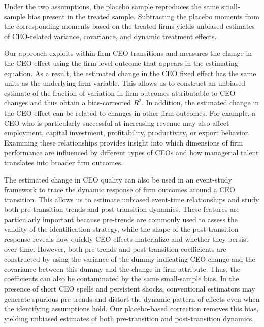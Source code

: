 \documentclass[11pt,a4paper]{article}
\begin{document}
Under the two assumptions, the placebo sample reproduces the same small-sample bias present in the treated sample. Subtracting the placebo moments from the corresponding moments based on the treated firms yields unbiased estimates of CEO-related variance, covariance, and dynamic treatment effects.

Our approach exploits within-firm CEO transitions and measures the change in the CEO effect using the firm-level outcome that appears in the estimating equation. As a result, the estimated change in the CEO fixed effect has the same units as the underlying firm variable. This allows us to construct an unbiased estimate of the fraction of variation in firm outcomes attributable to CEO changes and thus obtain a bias-corrected $R^2$. In addition, the estimated change in the CEO effect can be related to changes in other firm outcomes. For example, a CEO who is particularly successful at increasing revenue may also affect employment, capital investment, profitability, productivity, or export behavior. Examining these relationships provides insight into which dimensions of firm performance are influenced by different types of CEOs and how managerial talent translates into broader firm outcomes. 

The estimated change in CEO quality can also be used in an event-study framework to trace the dynamic response of firm outcomes around a CEO transition. This allows us to estimate unbiased event-time relationships and study both pre-transition trends and post-transition dynamics. These features are particularly important because pre-trends are commonly used to assess the validity of the identification strategy, while the shape of the post-transition response reveals how quickly CEO effects materialize and whether they persist over time. However, both pre-trends and post-transition coefficients are constructed by using the variance of the dummy indicating CEO change and the covariance between this dummy and the change in firm attribute. Thus, the coefficients can also be contaminated by the same small-sample bias. In the presence of short CEO spells and persistent shocks, conventional estimators may generate spurious pre-trends and distort the dynamic pattern of effects even when the identifying assumptions hold. Our placebo-based correction removes this bias, yielding unbiased estimates of both pre-transition and post-transition dynamics.
\end{document}
